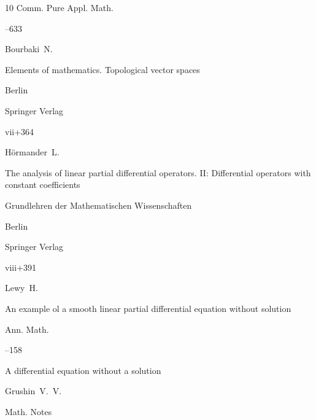 \begin{thebibliography}{10}
\jour Comm. Pure Appl. Math.




--633 




\by Bourbaki~N.

\book  Elements of mathematics. Topological vector spaces


\publaddr Berlin 

\publ Springer Verlag

\totalpages vii+364 







\by H\"ormander~L.

\book The analysis of linear partial differential operators\rm. II: Differential operators with constant coefficients


\serial Grundlehren der Mathematischen Wissenschaften


\publaddr Berlin

\publ Springer Verlag

\totalpages viii+391 





\by Lewy~H. 

\paper An example ol a smooth linear partial differential equation without solution

\jour Ann. Math.





--158






\paper A differential equation without a solution

\by  Grushin~V.~V.

\jour Math. Notes



\end{thebibliography}
